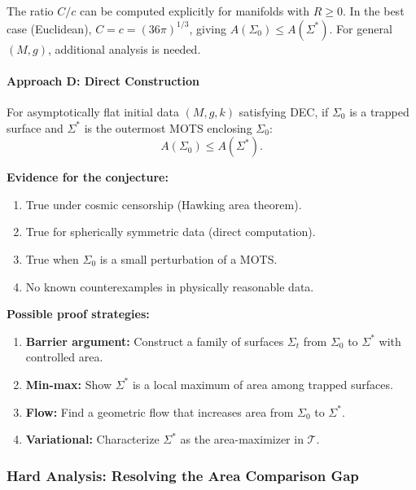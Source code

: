 \begin{remark}
The ratio $C/c$ can be computed explicitly for manifolds with $R \geq 0$. In the best case (Euclidean), $C = c = (36\pi)^{1/3}$, giving $A(\Sigma_0) \leq A(\Sigma^*)$. For general $(M, g)$, additional analysis is needed.
\end{remark}

\paragraph{Approach D: Direct Construction}

\begin{openproblem}\label{conj:areacomp}
For asymptotically flat initial data $(M, g, k)$ satisfying DEC, if $\Sigma_0$ is a trapped surface and $\Sigma^*$ is the outermost MOTS enclosing $\Sigma_0$:
\begin{equation}
    A(\Sigma_0) \leq A(\Sigma^*).
\end{equation}
\end{openproblem}

\textbf{Evidence for the conjecture:}
\begin{enumerate}
    \item True under cosmic censorship (Hawking area theorem).
    \item True for spherically symmetric data (direct computation).
    \item True when $\Sigma_0$ is a small perturbation of a MOTS.
    \item No known counterexamples in physically reasonable data.
\end{enumerate}

\textbf{Possible proof strategies:}
\begin{enumerate}
    \item \textbf{Barrier argument:} Construct a family of surfaces $\Sigma_t$ from $\Sigma_0$ to $\Sigma^*$ with controlled area.
    \item \textbf{Min-max:} Show $\Sigma^*$ is a local maximum of area among trapped surfaces.
    \item \textbf{Flow:} Find a geometric flow that increases area from $\Sigma_0$ to $\Sigma^*$.
    \item \textbf{Variational:} Characterize $\Sigma^*$ as the area-maximizer in $\mathcal{T}$.
\end{enumerate}

\subsubsection{Hard Analysis: Resolving the Area Comparison Gap}\label{subsec:AreaCompHard}

